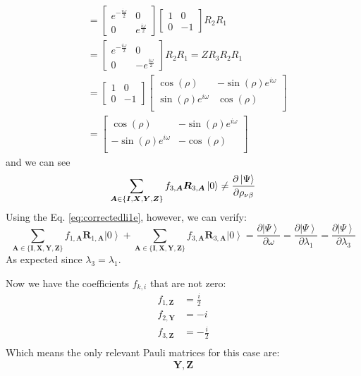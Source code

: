 \documentclass{aux/ttuthes2007}
\newcommand{\ket}[1]{\ensuremath{\left|#1\right\rangle}}
\newcommand{\s}[1]{\sin\left( #1 \right)}
\newcommand{\co}[1]{\cos\left( #1 \right)}
\newcommand{\fpd}[2]{\frac{\partial #1}{\partial #2}}
\newcommand{\ind}[1]{{\uo #1 \oo #1}}
\newcommand{\uo}[1]{
		\IfEqCase{#1}{
			{0}{\mu}
			{1}{\nu}
			{2}{\xi}
		}[\PackageError{uo}{Undefined option to uo: #1}{}]
}
\newcommand{\oo}[1]{
		\IfEqCase{#1}{
			{0}{\alpha}
			{1}{\beta}
			{2}{\gamma}
		}[\PackageError{unocorb}{Undefined option to unuo: #1}{}]
}
\newcommand{\Z}{\begin{bmatrix}	1 & 0 \\ 0 & -1 \end{bmatrix} }
\begin{document}
\begin{enumerate}
\begin{align*}
	&=\begin{bmatrix}
		e^{-\frac {i\omega} 2} & 0 \\
		0 & e^{\frac {i\omega} 2}
	\end{bmatrix} 
	\Z R_2 R_1
	\\
	&=\begin{bmatrix}
		e^{-\frac {i\omega} 2} & 0 \\
		0 & -e^{\frac {i\omega} 2}
	\end{bmatrix} 
	R_2 R_1
	= Z R_3 R_2 R_1
	\\
	&= \begin{bmatrix}1 & 0 \\ 0 & -1\end{bmatrix}
	\begin{bmatrix}
		\co \rho & - \s \rho e^{i\omega} \\
		\s \rho e^{i\omega} & \co \rho\\
	\end{bmatrix} 
	\\
	&= \begin{bmatrix}
		\co \rho &  -\s \rho e^{i\omega} \\
		-\s \rho e^{i\omega} & -\co \rho\\
	\end{bmatrix} 
\end{align*}
%
and we can see
%
$$
	\sum_{\bm A \in \{\bm I, \bm X, \bm Y, \bm Z\}} f_{3, \bm A} \bm R_{3, \bm A} \ket 0 
	\neq \fpd{\ket\Psi}{\rho_\ind 1}
$$
%
Using the Eq. \ref{eq:correctedli1e}, however, we can verify:
%
$$
	\sum_{\bm A \in \{\bm I, \bm X, \bm Y, \bm Z\}} f_{1, \bm A} \bm R_{1, \bm A} \ket 0 
	+ \sum_{\bm A \in \{\bm I, \bm X, \bm Y, \bm Z\}} f_{3, \bm A} \bm R_{3, \bm A} \ket 0 
	= \fpd{\ket\Psi}{\omega}
	= \fpd{\ket\Psi}{\lambda_1}
	= \fpd{\ket\Psi}{\lambda_3}
$$
%
As expected since $\lambda_3 = \lambda_1$.
%
\end{enumerate}
%
Now we have the coefficients $f_{k, i}$ that are not zero:
%
\begin{equation*}
	\begin{split}
		f_{1, \bm {Z}} &= \frac i 2 \\
		f_{2, \bm {Y}} &= -i \\
		f_{3, \bm {Z}} &= -\frac i 2 \\
	\end{split}
\end{equation*}
%
Which means the only relevant Pauli matrices for this case are:
%
\begin{align*}
	\bm Y, \bm Z
\end{align*}
\end{document}
